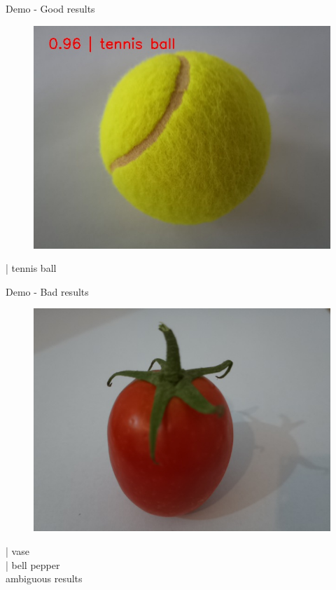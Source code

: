 \begin{frame}{Demo - Good results}
  \begin{figure}
	\includegraphics[width=\linewidth,height=0.5\textheight,keepaspectratio]{images/tennis_ball_output.jpeg}
  \end{figure}
   | tennis ball
\end{frame}

\begin{frame}{Demo - Bad results}
  \begin{figure}
	\includegraphics[width=\linewidth,height=0.5\textheight,keepaspectratio]{images/tomato.jpeg}
  \end{figure}
   | vase \\
   | bell pepper \\
  \ttfamily ambiguous results
\end{frame}

